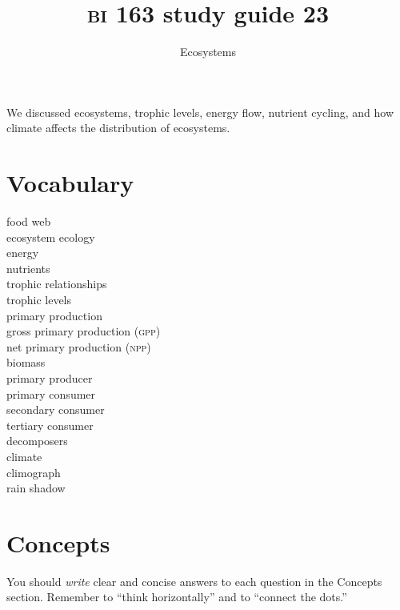 \documentclass[letterpaper]{tufte-handout}
\title{{\scshape bi} 163 study guide 23}
\author{Ecosystems}
\date{} %
\begin{document}
\maketitle	%

We discussed ecosystems, trophic levels, energy flow, nutrient cycling, and how climate affects the distribution of ecosystems.

\section*{Vocabulary}

\vspace{-1\baselineskip}
\begin{multicols}{2}
food web\\
ecosystem ecology\\
energy \\
nutrients \\
trophic relationships\\
trophic levels\\
primary production\\
gross primary production (\textsc{gpp})\\
net primary production (\textsc{npp})\\
biomass\\
primary producer\\
primary consumer\\
secondary consumer\\
tertiary consumer\\
decomposers\\
climate \\
climograph \\
rain shadow
\end{multicols}

\section*{Concepts}

You should \emph{write} clear and concise answers to each question in the Concepts section.  Remember to ``think horizontally'' and to ``connect the dots.'' 
\end{document}
